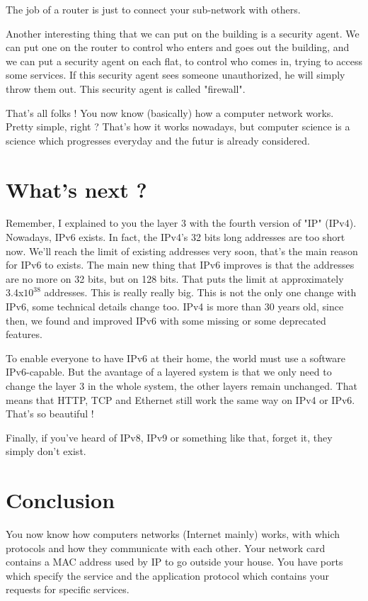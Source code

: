 \documentclass{article}
\begin{document}
	The job of a router is just to connect your sub-network with others.
	
	Another interesting thing that we can put on the building is a security agent. We can put one on the router to
	control who enters and goes out the building, and we can put a security agent on each flat, to control who comes in, 
	trying to access some services. If this security agent sees someone unauthorized, he will simply throw them out.
	This security agent is called "firewall".
	
	That's all folks ! You now know (basically) how a computer network works. Pretty simple, right ? That's how it works
	nowadays, but computer science is a science which progresses everyday and the futur is already considered.

\section{What's next ?}

	Remember, I explained to you the layer 3 with the fourth version of "IP" (IPv4). Nowadays, IPv6 exists. In fact, the
	IPv4's 32 bits long addresses are too short now. We'll reach the limit of existing addresses very soon, that's the
	main reason for IPv6 to exists. The main new thing that IPv6 improves is that the addresses are no more on 32 bits,
	but on 128 bits. That puts the limit at approximately 3.4x$10^{38}$ addresses. This is really really big.
	This is not the only one change with IPv6, some technical details change too. IPv4 is more than 30 years old, 
	since then, we found and improved IPv6 with some missing or some deprecated features.
	
	To enable everyone to have IPv6 at their home, the world must use a software IPv6-capable. But the avantage of a
	layered system is that we only need to change the layer 3 in the whole system, the other layers remain unchanged. That means
	that HTTP, TCP and Ethernet still work the same way on IPv4 or IPv6. That's so beautiful !
	
	Finally, if you've heard of IPv8, IPv9 or something like that, forget it, they simply don't exist.

\section{Conclusion}

	You now know how computers networks (Internet mainly) works, with which protocols and how they communicate with each other.
	Your network card contains a MAC address used by IP to go outside your house. You have ports which specify the service
	and the application protocol which contains your requests for specific services.
	
\end{document}
